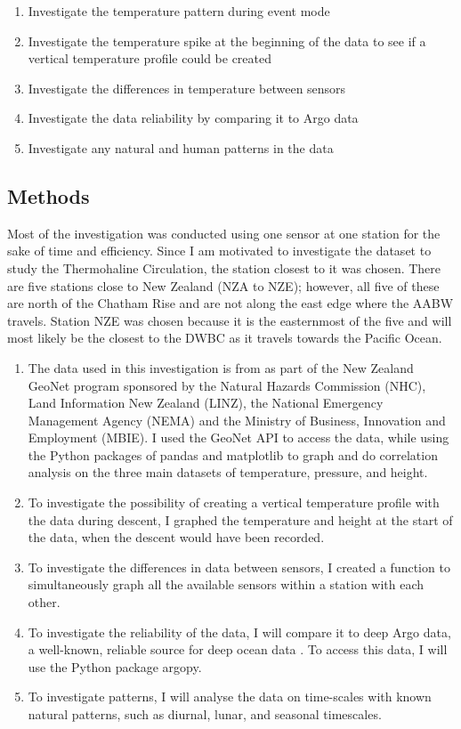 \documentclass[12pt,a4paper]{article}
\newcommand{\tightlist}{\setlength{\itemsep}{0pt}\setlength{\parskip}{0pt}}
\begin{document}
\begin{enumerate}\tightlist
  \item Investigate the temperature pattern during event mode
  \item Investigate the temperature spike at the beginning of the data to see
  if a vertical temperature profile could be created
  \item Investigate the differences in temperature between sensors
  \item Investigate the data reliability by comparing it to Argo data
  \item Investigate any natural and human patterns in the data
\end{enumerate}

\subsection{Methods}

Most of the investigation was conducted using one sensor at one station for
the sake of time and efficiency. Since I am motivated to investigate the
dataset to study the Thermohaline Circulation, the station closest to it was
chosen. There are five stations close to New Zealand (NZA to NZE); however, all five of
these are north of the Chatham Rise and are not along the east edge where the
AABW travels. Station NZE was chosen because it is the easternmost of the five
and will most likely be the closest to the DWBC as it travels towards the
Pacific Ocean.

\begin{enumerate}\tightlist
  \item The data used in this investigation is from \citet{gns2020} as part of
  the New Zealand GeoNet program sponsored by the Natural Hazards Commission
  (NHC), Land Information New Zealand (LINZ), the National Emergency
  Management Agency (NEMA) and the Ministry of Business, Innovation and
  Employment (MBIE). I used the GeoNet API to access the data, while using the
  Python packages of pandas and matplotlib to graph and do correlation
  analysis on the three main datasets of temperature, pressure, and height.
  \item To investigate the possibility of creating a vertical temperature
  profile with the data during descent, I graphed the temperature and height
  at the start of the data, when the descent would have been recorded.
  \item To investigate the differences in data between sensors, I created a
  function to simultaneously graph all the available sensors within a station
  with each other.
  \item To investigate the reliability of the data, I will compare it to deep
  Argo data, a well-known, reliable source for deep ocean data
  \citep{argo2025}. To access this data, I will use the Python package
  argopy.
  \item To investigate patterns, I will analyse the data on time-scales with
  known natural patterns, such as diurnal, lunar, and seasonal timescales.
\end{enumerate}
\end{document}
